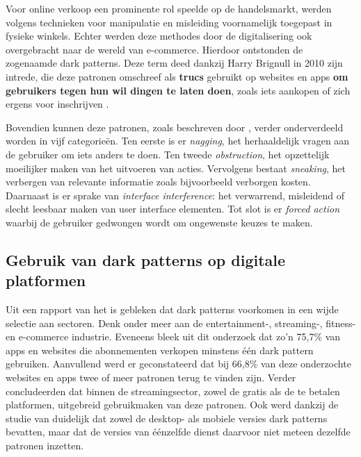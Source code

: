 \vspace{1em}

Voor online verkoop een prominente rol speelde op de handelsmarkt, werden volgens \textcite{Kollmer2022} technieken voor manipulatie en misleiding voornamelijk toegepast in fysieke winkels. Echter werden deze methodes door de digitalisering ook overgebracht naar de wereld van e-commerce. Hierdoor ontstonden de zogenaamde dark patterns. Deze term deed dankzij Harry Brignull in 2010 zijn intrede, die deze patronen omschreef als \textbf{trucs} gebruikt op websites en apps \textbf{om gebruikers tegen hun wil dingen te laten doen}, zoals iets aankopen of zich ergens voor inschrijven \autocite{Kollmer2022}. 

\vspace{1em}

Bovendien kunnen deze patronen, zoals beschreven door \textcite{DiGeronimo2020}, verder onderverdeeld worden in vijf categorieën. Ten eerste is er \emph{nagging}, het herhaaldelijk vragen aan de gebruiker om iets anders te doen. Ten tweede \emph{obstruction}, het opzettelijk moeilijker maken van het uitvoeren van acties. Vervolgens bestaat \emph{sneaking}, het verbergen van relevante informatie zoals bijvoorbeeld verborgen kosten. Daarnaast is er sprake van \emph{interface interference}: het verwarrend, misleidend of slecht leesbaar maken van user interface elementen. Tot slot is er \emph{forced action} waarbij de gebruiker gedwongen wordt om ongewenste keuzes te maken.

\vspace{1em}

\subsection{Gebruik van dark patterns op digitale platformen}
\label{subsec:verspreiding}

\vspace{1em}

Uit een rapport van het \textcite{ICPEN2024} is gebleken dat dark patterns voorkomen in een wijde selectie aan sectoren. Denk onder meer aan de entertainment-, streaming-, fitness- en e-commerce industrie. Eveneens bleek uit dit onderzoek dat zo’n 75,7\% van apps en websites die abonnementen verkopen minstens één dark pattern gebruiken. Aanvullend werd er geconstateerd dat bij 66,8\% van deze onderzochte websites en apps twee of meer patronen terug te vinden zijn. Verder concludeerden \textcite{Nygren2024} dat binnen de streamingsector, zowel de gratis als de te betalen platformen, uitgebreid gebruikmaken van deze patronen. Ook werd dankzij de studie van \textcite{Gunawan2021} duidelijk dat zowel de desktop- als mobiele versies dark patterns bevatten, maar dat de versies van éénzelfde dienst daarvoor niet meteen dezelfde patronen inzetten.


